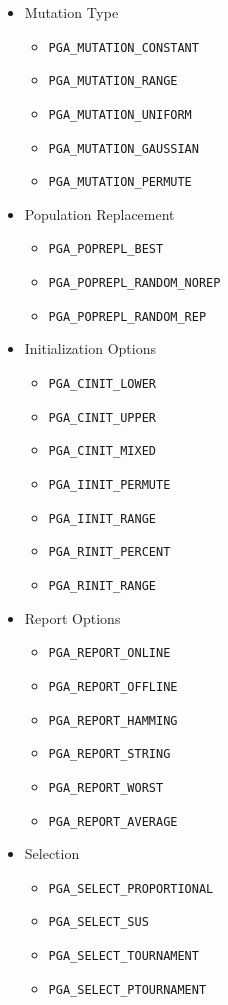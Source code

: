 \documentclass{report}
\begin{document}
\begin{itemize}
\item Mutation Type
\begin{itemize}
\item {\tt PGA\_MUTATION\_CONSTANT}
\item {\tt PGA\_MUTATION\_RANGE}
\item {\tt PGA\_MUTATION\_UNIFORM}
\item {\tt PGA\_MUTATION\_GAUSSIAN}
\item {\tt PGA\_MUTATION\_PERMUTE}
\end{itemize}
    
\item Population Replacement
\begin{itemize}
\item {\tt PGA\_POPREPL\_BEST}
\item {\tt PGA\_POPREPL\_RANDOM\_NOREP}
\item {\tt PGA\_POPREPL\_RANDOM\_REP}
\end{itemize}

\item Initialization Options
\begin{itemize}
\item {\tt PGA\_CINIT\_LOWER}
\item {\tt PGA\_CINIT\_UPPER}
\item {\tt PGA\_CINIT\_MIXED}
\item {\tt PGA\_IINIT\_PERMUTE}
\item {\tt PGA\_IINIT\_RANGE}
\item {\tt PGA\_RINIT\_PERCENT}
\item {\tt PGA\_RINIT\_RANGE}
\end{itemize}

\item Report Options
\begin{itemize}
\item {\tt PGA\_REPORT\_ONLINE}
\item {\tt PGA\_REPORT\_OFFLINE}
\item {\tt PGA\_REPORT\_HAMMING}
\item {\tt PGA\_REPORT\_STRING}
\item {\tt PGA\_REPORT\_WORST}
\item {\tt PGA\_REPORT\_AVERAGE}
\end{itemize}

\item Selection
\begin{itemize}
\item {\tt PGA\_SELECT\_PROPORTIONAL}
\item {\tt PGA\_SELECT\_SUS}
\item {\tt PGA\_SELECT\_TOURNAMENT}
\item {\tt PGA\_SELECT\_PTOURNAMENT}
\end{itemize}


\end{itemize}
\end{document}
